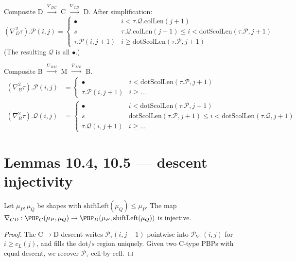 \begin{definition}
  \label{def:doubleDescent_D}
  \leanok
  Composite D $\xrightarrow{\nabla_{DC}}$ C $\xrightarrow{\nabla_{CD}}$ D.
  After simplification:
  \[
    (\nabla^2_D \tau).\mathcal{P}(i, j) = \begin{cases}
      \bullet & i < \tau.\mathcal{Q}.\mathrm{colLen}(j + 1) \\
      s & \tau.\mathcal{Q}.\mathrm{colLen}(j + 1) \leq i < \mathrm{dotScolLen}(\tau.\mathcal{P}, j + 1) \\
      \tau.\mathcal{P}(i, j + 1) & i \geq \mathrm{dotScolLen}(\tau.\mathcal{P}, j + 1)
    \end{cases}
  \]
  (The resulting $\mathcal{Q}$ is all $\bullet$.)
\end{definition}

\begin{definition}
  \label{def:doubleDescent_B}
  \leanok
  Composite B $\xrightarrow{\nabla_{BM}}$ M $\xrightarrow{\nabla_{MB}}$ B.
  \begin{align*}
    (\nabla^2_B \tau).\mathcal{P}(i, j) &= \begin{cases} \bullet & i < \mathrm{dotScolLen}(\tau.\mathcal{P}, j + 1) \\ \tau.\mathcal{P}(i, j + 1) & i \geq \ldots \end{cases} \\
    (\nabla^2_B \tau).\mathcal{Q}(i, j) &= \begin{cases} \bullet & i < \mathrm{dotScolLen}(\tau.\mathcal{P}, j + 1) \\ s & \mathrm{dotScolLen}(\tau.\mathcal{P}, j + 1) \leq i < \mathrm{dotScolLen}(\tau.\mathcal{Q}, j + 1) \\ \tau.\mathcal{Q}(i, j + 1) & i \geq \ldots \end{cases}
  \end{align*}
\end{definition}

\section{Lemmas 10.4, 10.5 — descent injectivity}

\begin{lemma}
  \label{lem:10_4_C}
  \leanok
  Let $\mu_P, \mu_Q$ be shapes with $\mathrm{shiftLeft}(\mu_Q) \leq \mu_P$.
  The map $\nabla_{CD} : \PBP_C(\mu_P, \mu_Q) \to \PBP_D(\mu_P, \mathrm{shiftLeft}(\mu_Q))$ is injective.
\end{lemma}
\begin{proof}
  \leanok
  The C$\to$D descent writes $\mathcal{P}_\tau(i, j + 1)$ pointwise into $\mathcal{P}_{\nabla\tau}(i, j)$ for $i \geq c_L(j)$, and fills the dot/$s$ region uniquely. Given two C-type PBPs with equal descent, we recover $\mathcal{P}_\tau$ cell-by-cell.
\end{proof}


